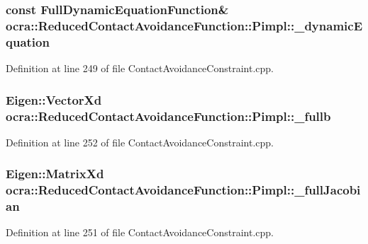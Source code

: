 \subsubsection[{\texorpdfstring{\+\_\+dynamic\+Equation}{_dynamicEquation}}]{\setlength{\rightskip}{0pt plus 5cm}const {\bf Full\+Dynamic\+Equation\+Function}\& ocra\+::\+Reduced\+Contact\+Avoidance\+Function\+::\+Pimpl\+::\+\_\+dynamic\+Equation}\hypertarget{structReducedContactAvoidanceFunction_1_1Pimpl_a2993139449f5c29b4a85a9e3c261834c}{}\label{structReducedContactAvoidanceFunction_1_1Pimpl_a2993139449f5c29b4a85a9e3c261834c}


Definition at line 249 of file Contact\+Avoidance\+Constraint.\+cpp.

\subsubsection[{\texorpdfstring{\+\_\+fullb}{_fullb}}]{\setlength{\rightskip}{0pt plus 5cm}Eigen\+::\+Vector\+Xd ocra\+::\+Reduced\+Contact\+Avoidance\+Function\+::\+Pimpl\+::\+\_\+fullb}\hypertarget{structReducedContactAvoidanceFunction_1_1Pimpl_ade6d248f540e91b5b9cfe961981d03a3}{}\label{structReducedContactAvoidanceFunction_1_1Pimpl_ade6d248f540e91b5b9cfe961981d03a3}


Definition at line 252 of file Contact\+Avoidance\+Constraint.\+cpp.

\subsubsection[{\texorpdfstring{\+\_\+full\+Jacobian}{_fullJacobian}}]{\setlength{\rightskip}{0pt plus 5cm}Eigen\+::\+Matrix\+Xd ocra\+::\+Reduced\+Contact\+Avoidance\+Function\+::\+Pimpl\+::\+\_\+full\+Jacobian}\hypertarget{structReducedContactAvoidanceFunction_1_1Pimpl_a6ddc277e90776add368eee6a56494f45}{}\label{structReducedContactAvoidanceFunction_1_1Pimpl_a6ddc277e90776add368eee6a56494f45}


Definition at line 251 of file Contact\+Avoidance\+Constraint.\+cpp.

